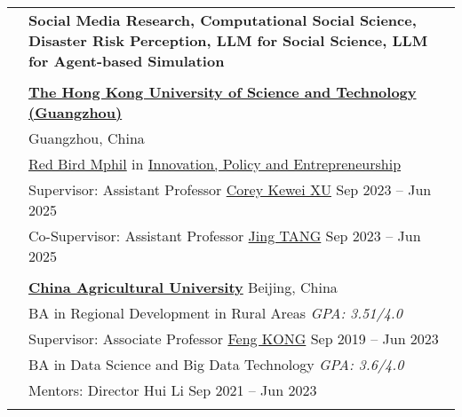 \documentclass[letterpaper, 11pt]{article}
\begin{document}
\begin{longtable}{p{1.3in}p{4.8in}}



\nohyphens{\color{RoyalBlue}{Research Interests}}
& \bf{Social Media Research, Computational Social Science, Disaster Risk Perception, LLM for Social Science, LLM for Agent-based Simulation}\\
& \\



\color{RoyalBlue}{Education} 
& \textbf{\href{https://www.hkust-gz.edu.cn/}{The Hong Kong University of Science and Technology (Guangzhou)}} \\
& \hfill Guangzhou, China \\
& \href{https://www.hkust-gz.edu.cn/academics/teaching-and-learning-innovation/red-bird-mphil-program/}{Red Bird Mphil} in \href{https://www.hkust-gz.edu.cn/academics/hubs-and-thrust-areas/society-hub/innovation-policy-and-entrepreneurship/}{Innovation, Policy and Entrepreneurship} \\
& Supervisor: Assistant Professor \href{https://facultyprofiles.hkust-gz.edu.cn/faculty-personal-page/XU-Kewei/coreyxu}{Corey Kewei XU}  \hfill Sep 2023 -- Jun 2025\\
& Co-Supervisor: Assistant Professor \href{https://facultyprofiles.hkust-gz.edu.cn/faculty-personal-page/TANG-Jing/jingtang}{Jing TANG}  \hfill Sep 2023 -- Jun 2025\\
& \\

& \textbf{\href{http://en.cau.edu.cn/}{China Agricultural University}} \hfill Beijing, China\\
& BA in Regional Development in Rural Areas \hfill{\it GPA: 3.51/4.0} \\
& Supervisor: Associate Professor \href{https://cohd.cau.edu.cn/art/2020/11/27/art_48059_998984.html}{Feng KONG}  \hfill Sep 2019 -- Jun 2023\\
& BA in Data Science and Big Data Technology  \hfill{\it GPA: 3.6/4.0} \\
& Mentors: Director Hui Li \hfill Sep 2021 -- Jun 2023 \\
& \\


\end{longtable}
\end{document}
